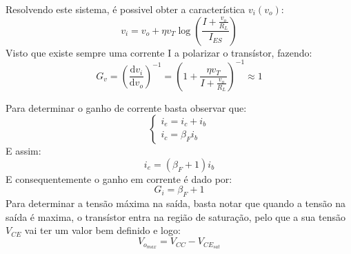 \documentclass[%
  reprint,
  nofootinbib,
  amsmath,amssymb,
  aps,
  10pt,
  a4paper
]{revtex4-1}
\begin{document}
Resolvendo este sistema, é possivel obter a característica $v_i(v_o)$:
\begin{equation}
v_i=v_o+\eta v_T\log \left(\frac{I+\frac{v_o}{R_L}}{I_{ES}}\right)
\end{equation}
Visto que existe sempre uma corrente I a polarizar o transístor, fazendo:
\begin{equation}
G_v=\left(\frac{\mathrm{d}v_i}{\mathrm{d}v_o}\right)^{-1}=\left(1+\frac{\eta v_T}{I+\frac{v_o}{R_L}}\right)^{-1}\approx 1
\label{eq:g_v}
\end{equation}

Para determinar o ganho de corrente basta observar que:
\begin{equation}
\begin{cases} i_e=i_c+i_b\\ i_c=\beta_F i_b
\end{cases}
\end{equation}
E assim:
\begin{equation}
i_e=(\beta_F+1)i_b
\end{equation}
E consequentemente o ganho em corrente é dado por:
\begin{equation}
G_i=\beta_F+1
\label{eq:g_i}
\end{equation}
Para determinar a tensão máxima na saída, basta notar que quando a tensão na saída é maxima, o transístor entra na região de saturação, pelo que a sua tensão $V_{CE}$ vai ter um valor bem definido e logo:
\begin{equation}
V_{o_{max}}=V_{CC}-V_{{CE}_{sat}}
\label{eq:sat}
\end{equation}
\end{document}
